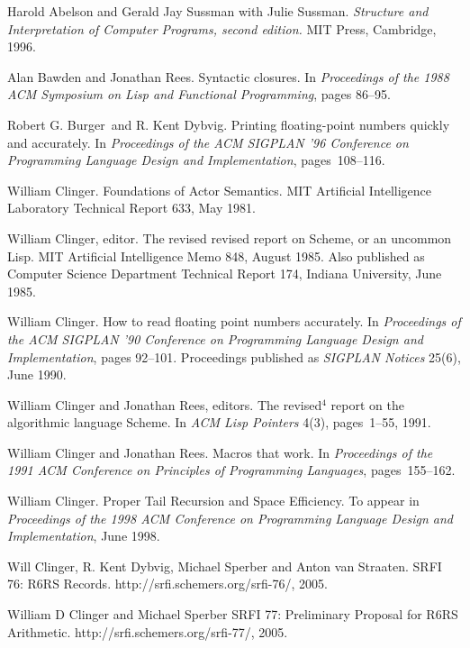 \begin{thebibliography}{999}

Harold Abelson and Gerald Jay Sussman with Julie Sussman.
{\em Structure and Interpretation of Computer Programs, second edition.}
MIT Press, Cambridge, 1996.

Alan Bawden and Jonathan Rees.
Syntactic closures.
In {\em Proceedings of the 1988 ACM Symposium on Lisp and
  Functional Programming}, pages 86--95.

Robert G. Burger~and R. Kent Dybvig.
Printing floating-point numbers quickly and accurately.
In {\em Proceedings of the ACM SIGPLAN '96 Conference
  on Programming Language Design and Implementation}, pages~108--116.

William Clinger.
Foundations of Actor Semantics.
MIT Artificial Intelligence Laboratory Technical Report 633, May 1981.

William Clinger, editor.
The revised revised report on Scheme, or an uncommon Lisp.
MIT Artificial Intelligence Memo 848, August 1985.
Also published as Computer Science Department Technical Report 174,
  Indiana University, June 1985.

William Clinger.
How to read floating point numbers accurately.
In {\em Proceedings of the ACM SIGPLAN '90 Conference
  on Programming Language Design and Implementation}, pages 92--101.
Proceedings published as {\em SIGPLAN Notices} 25(6), June 1990.

William Clinger and Jonathan Rees, editors.
The revised$^4$ report on the algorithmic language Scheme.
In {\em ACM Lisp Pointers} 4(3), pages~1--55, 1991.

William Clinger and Jonathan Rees.
Macros that work.
In {\em Proceedings of the 1991 ACM Conference on Principles of
  Programming Languages}, pages~155--162.

William Clinger.
Proper Tail Recursion and Space Efficiency.
To appear in {\em Proceedings of the 1998 ACM Conference on Programming
 Language Design and Implementation}, June 1998.

Will Clinger, R. Kent Dybvig, Michael Sperber and Anton van Straaten.
SRFI 76: R6RS Records.
{\cf http://srfi.schemers.org/srfi-76/}, 2005.

William D Clinger and Michael Sperber
SRFI 77: Preliminary Proposal for R6RS Arithmetic.
{\cf http://srfi.schemers.org/srfi-77/}, 2005.


\end{thebibliography}
